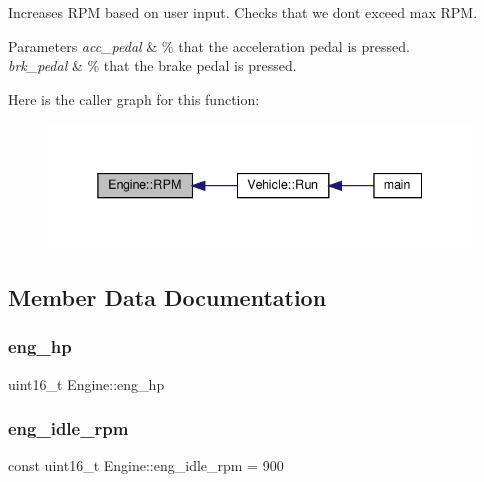 Increases R\+PM based on user input. Checks that we dont exceed max R\+PM. 
\begin{DoxyParams}{Parameters}
{\em acc\+\_\+pedal} & \% that the acceleration pedal is pressed. \\
\hline
{\em brk\+\_\+pedal} & \% that the brake pedal is pressed. \\
\hline
\end{DoxyParams}
Here is the caller graph for this function\+:
\nopagebreak
\begin{figure}[H]
\begin{center}
\leavevmode
\includegraphics[width=338pt]{classEngine_aaeaf10a957802225b43d088b5c2ce54b_icgraph}
\end{center}
\end{figure}


\subsection{Member Data Documentation}
\mbox{\label{classEngine_a450f51a16e7aa1af382193e8acf6e36a}} 
\subsubsection{\texorpdfstring{eng\+\_\+hp}{eng\_hp}}
{\footnotesize\ttfamily uint16\+\_\+t Engine\+::eng\+\_\+hp\hspace{0.3cm}{\ttfamily [private]}}

\mbox{\label{classEngine_a4a099af57c5bb8df6006aeab0e1f30ae}} 
\subsubsection{\texorpdfstring{eng\+\_\+idle\+\_\+rpm}{eng\_idle\_rpm}}
{\footnotesize\ttfamily const uint16\+\_\+t Engine\+::eng\+\_\+idle\+\_\+rpm = 900\hspace{0.3cm}{\ttfamily [private]}}

